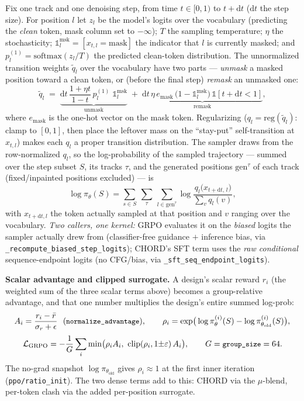 \documentclass[11pt]{article}
\newcommand{\ttk}[1]{\texttt{\small #1}}
\begin{document}
Fix one track and one denoising step, from time $t\in[0,1)$ to $t+\mathrm dt$ ($\mathrm dt$ the step
size). For position $l$ let $z_l$ be the model's logits over the vocabulary (predicting the
\emph{clean} token, mask column set to $-\infty$); $T$ the sampling temperature; $\eta$ the
stochasticity; $\mathbb 1^{\mathrm{msk}}_l=[x_{t,l}{=}\text{mask}]$ the indicator that $l$ is
currently masked; and $p^{(1)}_l=\mathrm{softmax}(z_l/T)$ the predicted clean-token distribution.
The unnormalized transition weights $\tilde q_l$ over the vocabulary have two parts --- \emph{unmask}
a masked position toward a clean token, or (before the final step) \emph{remask} an unmasked one:
\[
\tilde q_l \;=\;
\underbrace{\mathrm dt\,\frac{1+\eta t}{1-t}\,p^{(1)}_l\;\mathbb 1^{\mathrm{msk}}_l}_{\text{unmask}}
\;+\;
\underbrace{\mathrm dt\,\eta\,e_{\text{mask}}\,\big(1-\mathbb 1^{\mathrm{msk}}_l\big)\,\mathbb 1[t{+}\mathrm dt<1]}_{\text{remask}},
\]
where $e_{\text{mask}}$ is the one-hot vector on the mask token. Regularizing
($q_l=\mathrm{reg}(\tilde q_l)$: clamp to $[0,1]$, then place the leftover mass on the ``stay-put''
self-transition at $x_{t,l}$) makes each $q_l$ a proper transition distribution. The sampler draws
from the row-normalized $q_l$, so the log-probability of the sampled trajectory --- summed over the
step subset $S$, its tracks $\tau$, and the generated positions $\mathrm{gen}^\tau$ of each track
(fixed/inpainted positions excluded) --- is
\[
\log\pi_\theta(S)=\sum_{s\in S}\ \sum_{\tau}\ \sum_{l\in\mathrm{gen}^\tau}
   \log\frac{q_l\!\big(x_{t+\mathrm dt,\,l}\big)}{\sum_{v} q_l(v)} ,
\]
with $x_{t+\mathrm dt,l}$ the token actually sampled at that position and $v$ ranging over the
vocabulary. \emph{Two callers, one kernel:} GRPO evaluates it on the \emph{biased} logits the sampler
actually drew from (classifier-free guidance $+$ inference bias, via
\ttk{\_recompute\_biased\_step\_logits}); CHORD's SFT term uses the \emph{raw conditional}
sequence-endpoint logits (no CFG/bias, via \ttk{\_sft\_seq\_endpoint\_logits}).

\textbf{Scalar advantage and clipped surrogate.} A design's scalar reward $r_i$ (the weighted sum
of the three scalar terms above) becomes a group-relative advantage, and that one number
multiplies the design's entire summed log-prob:
\[
A_i=\frac{r_i-\bar r}{\sigma_r+\epsilon}\ \ (\ttk{normalize\_advantage}),
\qquad
\rho_i=\exp\!\big(\log\pi_\theta^{(i)}(S)-\log\pi_{\theta_{\mathrm{old}}}^{(i)}(S)\big),
\]
\[
\mathcal L_{\mathrm{GRPO}}=-\frac1G\sum_i\min\!\big(\rho_i A_i,\ \mathrm{clip}(\rho_i,1{\pm}\varepsilon)\,A_i\big),
\qquad G=\ttk{group\_size}=64 .
\]
The no-grad snapshot $\log\pi_{\theta_{\mathrm{old}}}$ gives $\rho_i\!\approx\!1$ at the first
inner iteration (\ttk{ppo/ratio\_init}). The two dense terms add to this: CHORD via the
$\mu$-blend, per-token clash via the added per-position surrogate.
\end{document}
